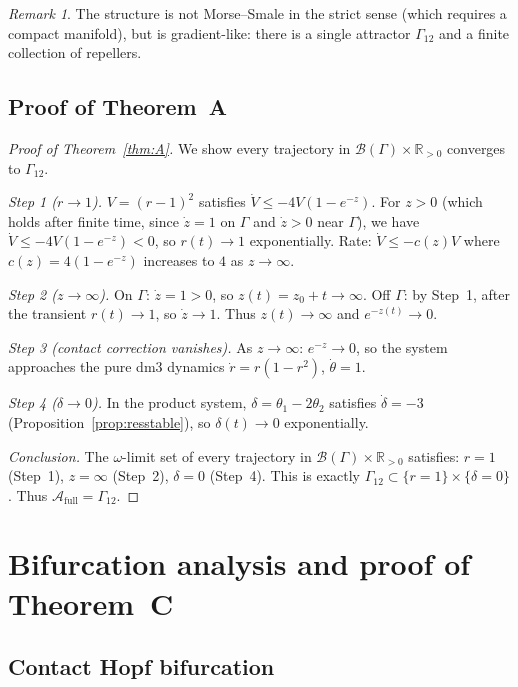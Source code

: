 \documentclass[reqno]{amsart}
\numberwithin{equation}{section}
\theoremstyle{plain}
\theoremstyle{definition}
\theoremstyle{remark}
\newtheorem{remark}[theorem]{Remark}
\newcommand{\R}{\mathbb{R}}
\newcommand{\Orb}{\Gamma}
\newcommand{\cB}{\mathcal{B}}
\begin{document}
\begin{remark}
The structure is not Morse--Smale in the strict sense (which requires
a compact manifold), but is gradient-like: there is a single attractor
$\Orb_{12}$ and a finite collection of repellers.
\end{remark}

\subsection{Proof of Theorem~A}

\begin{proof}[Proof of Theorem~\ref{thm:A}]
We show every trajectory in $\cB(\Orb)\times\R_{>0}$ converges to
$\Orb_{12}$.

\emph{Step 1 ($r\to 1$).}
$V=(r-1)^2$ satisfies $\dot V\le-4V(1-e^{-z})$.
For $z>0$ (which holds after finite time, since $\dot z=1$ on $\Orb$
and $\dot z>0$ near $\Orb$), we have $\dot V\le-4V(1-e^{-z})<0$,
so $r(t)\to 1$ exponentially. Rate: $\dot V\le-c(z)V$ where
$c(z)=4(1-e^{-z})$ increases to $4$ as $z\to\infty$.

\emph{Step 2 ($z\to\infty$).}
On $\Orb$: $\dot z=1>0$, so $z(t)=z_0+t\to\infty$.
Off $\Orb$: by Step~1, after the transient $r(t)\to 1$, so
$\dot z\to 1$. Thus $z(t)\to\infty$ and $e^{-z(t)}\to 0$.

\emph{Step 3 (contact correction vanishes).}
As $z\to\infty$: $e^{-z}\to 0$, so the system approaches the
pure dm3 dynamics $\dot r=r(1-r^2)$, $\dot\theta=1$.

\emph{Step 4 ($\delta\to 0$).}
In the product system, $\delta=\theta_1-2\theta_2$ satisfies
$\dot\delta=-3$ (Proposition~\ref{prop:resstable}), so
$\delta(t)\to 0$ exponentially.

\emph{Conclusion.}
The $\omega$-limit set of every trajectory in $\cB(\Orb)\times\R_{>0}$
satisfies: $r=1$ (Step~1), $z=\infty$ (Step~2), $\delta=0$ (Step~4).
This is exactly $\Orb_{12}\subset\{r=1\}\times\{\delta=0\}$.
Thus $\mathcal{A}_{\mathrm{full}}=\Orb_{12}$.
\end{proof}

\section{Bifurcation analysis and proof of Theorem~C}\label{sec:bifurcations}

\subsection{Contact Hopf bifurcation}
\end{document}
